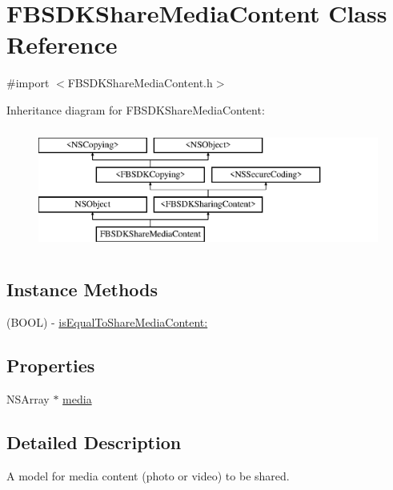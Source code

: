 \hypertarget{interface_f_b_s_d_k_share_media_content}{}\section{F\+B\+S\+D\+K\+Share\+Media\+Content Class Reference}
\label{interface_f_b_s_d_k_share_media_content}


{\ttfamily \#import $<$F\+B\+S\+D\+K\+Share\+Media\+Content.\+h$>$}

Inheritance diagram for F\+B\+S\+D\+K\+Share\+Media\+Content\+:\begin{figure}[H]
\begin{center}
\leavevmode
\includegraphics[height=4.000000cm]{interface_f_b_s_d_k_share_media_content}
\end{center}
\end{figure}
\subsection*{Instance Methods}
\begin{DoxyCompactItemize}
\item 
(B\+O\+O\+L) -\/ \hyperlink{interface_f_b_s_d_k_share_media_content_ada0ef3562791fd0c42cead2c97a00c58}{is\+Equal\+To\+Share\+Media\+Content\+:}
\end{DoxyCompactItemize}
\subsection*{Properties}
\begin{DoxyCompactItemize}
\item 
N\+S\+Array $\ast$ \hyperlink{interface_f_b_s_d_k_share_media_content_a90511d963c246197346780927ddf0b40}{media}
\end{DoxyCompactItemize}


\subsection{Detailed Description}
A model for media content (photo or video) to be shared. 

